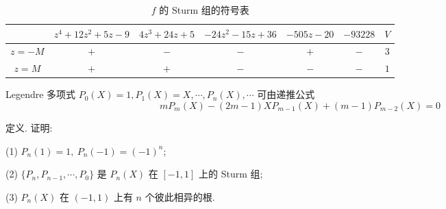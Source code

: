 \documentclass[color=black,device=normal,lang=cn,mode=geye]{elegantnote}
\begin{document}
\begin{table}\caption{$f$ 的 Sturm 组的符号表}\label{tb3}
    \centering
    \begin{tabular}{c|ccccc|c}
        & $z^4+12z^2+5z-9$ & $4z^3+24z+5$ & $-24z^2-15z+36$ & $-505z-20$ & $-93228$ & $V$ \\
        \hline
        $z=-M$ & $+$ & $-$ & $-$ & $+$ & $-$ & $3$ \\
        $z=M$  & $+$ & $+$ & $-$ & $-$ & $-$ & $1$ \\
    \end{tabular}
\end{table}
\begin{exercise}%
    Legendre 多项式 $P_0(X)=1,P_1(X)=X,\cdots,P_n(X),\cdots$ 可由递推公式
    \begin{equation}\label{eq5.4}
        mP_m(X)-(2m-1)XP_{m-1}(X)+(m-1)P_{m-2}(X)=0
    \end{equation}

    定义. 证明:

    (1) $P_n(1)=1,\ P_n(-1)=(-1)^n$;

    (2) $\{P_n,P_{n-1},\cdots,P_0\}$ 是 $P_n(X)$ 在 $[-1,1]$ 上的 Sturm 组;

    (3) $P_n(X)$ 在 $(-1,1)$ 上有 $n$ 个彼此相异的根.
\end{exercise}
\end{document}
